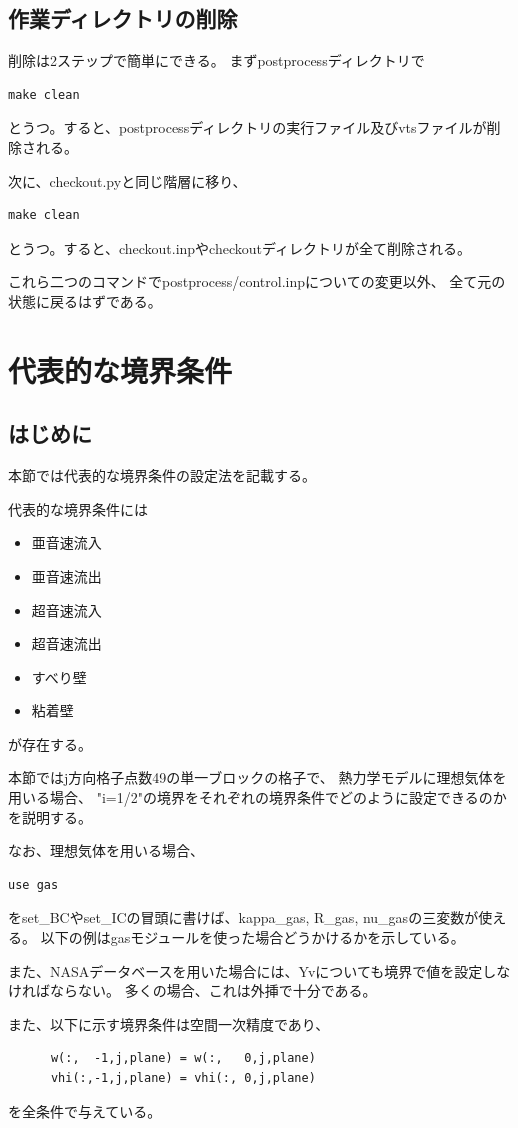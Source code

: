 \documentclass{jsarticle}
\begin{document}
\subsection{作業ディレクトリの削除}%
削除は2ステップで簡単にできる。
まずpostprocessディレクトリで
\begin{verbatim}
make clean
\end{verbatim}
とうつ。すると、postprocessディレクトリの実行ファイル及びvtsファイルが削除される。

次に、checkout.pyと同じ階層に移り、
\begin{verbatim}
make clean
\end{verbatim}
とうつ。すると、checkout.inpやcheckoutディレクトリが全て削除される。

これら二つのコマンドでpostprocess/control.inpについての変更以外、
全て元の状態に戻るはずである。
\newpage
\section{代表的な境界条件}%
\subsection{はじめに}%
本節では代表的な境界条件の設定法を記載する。

代表的な境界条件には
\begin{itemize}
\item 亜音速流入
\item 亜音速流出
\item 超音速流入
\item 超音速流出
\item すべり壁
\item 粘着壁
\end{itemize}
が存在する。

本節ではj方向格子点数49の単一ブロックの格子で、
熱力学モデルに理想気体を用いる場合、
"i=1/2"の境界をそれぞれの境界条件でどのように設定できるのかを説明する。

なお、理想気体を用いる場合、
\begin{verbatim}
use gas
\end{verbatim}
をset\_BCやset\_ICの冒頭に書けば、kappa\_gas, R\_gas, nu\_gasの三変数が使える。
以下の例はgasモジュールを使った場合どうかけるかを示している。

また、NASAデータベースを用いた場合には、Yvについても境界で値を設定しなければならない。
多くの場合、これは外挿で十分である。

また、以下に示す境界条件は空間一次精度であり、
\begin{verbatim}
      w(:,  -1,j,plane) = w(:,   0,j,plane) 
      vhi(:,-1,j,plane) = vhi(:, 0,j,plane) 
\end{verbatim}
を全条件で与えている。
\end{document}
